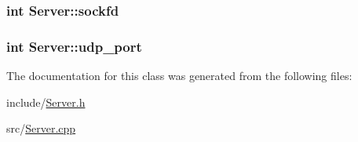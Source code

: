 \hypertarget{classServer_a284abf5ae92eeed0f5e28759d382dd2d}{
\subsubsection[{sockfd}]{\setlength{\rightskip}{0pt plus 5cm}int Server\-::sockfd\hspace{0.3cm}{\ttfamily [private]}}}\label{classServer_a284abf5ae92eeed0f5e28759d382dd2d}
\hypertarget{classServer_a60a838db7cee44ea45979e93c75137dd}{
\subsubsection[{udp\-\_\-port}]{\setlength{\rightskip}{0pt plus 5cm}int Server\-::udp\-\_\-port\hspace{0.3cm}{\ttfamily [private]}}}\label{classServer_a60a838db7cee44ea45979e93c75137dd}


The documentation for this class was generated from the following files\-:\begin{DoxyCompactItemize}
\item 
include/\hyperlink{Server_8h}{Server.\-h}\item 
src/\hyperlink{Server_8cpp}{Server.\-cpp}\end{DoxyCompactItemize}
